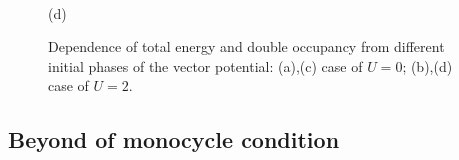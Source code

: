 \begin{figure}[h!]
\begin{minipage}[h]{0.5\linewidth}
\end{minipage}
\hfill
\begin{minipage}[h]{0.5\linewidth}
 \\(d)
\end{minipage}
\caption{Dependence of total energy and double occupancy from different initial phases of the vector potential: (a),(c) case of $U=0$; (b),(d) case of $U=2$.}
\label{fig:Etot_1}
\end{figure}

\FloatBarrier

\subsection{Beyond of monocycle condition}

